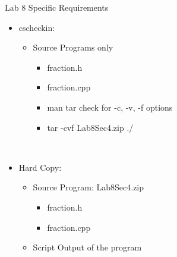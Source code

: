 \documentclass[presentation]{beamer}
\begin{document}
\begin{frame}[label=sec-10]{Lab 8 Specific Requirements}
\begin{itemize}
\item \alert{cscheckin}:
\begin{itemize}
\item \alert{Source Programs} only
\begin{itemize}
\item \alert{fraction.h}
\item \alert{fraction.cpp}
\item \alert{man tar} check for \alert{-c}, \alert{-v}, \alert{-f} options
\item \alert{tar -cvf Lab8Sec4.zip ./}
\end{itemize}
\end{itemize}
\end{itemize}
\\
\begin{itemize}
\item \alert{Hard Copy}:
\begin{itemize}
\item \alert{Source Program}: \alert{Lab8Sec4.zip}
\begin{itemize}
\item fraction.h
\item fraction.cpp
\end{itemize}
\item \alert{Script Output} of the program
\end{itemize}
\end{itemize}
\end{frame}
\end{document}
